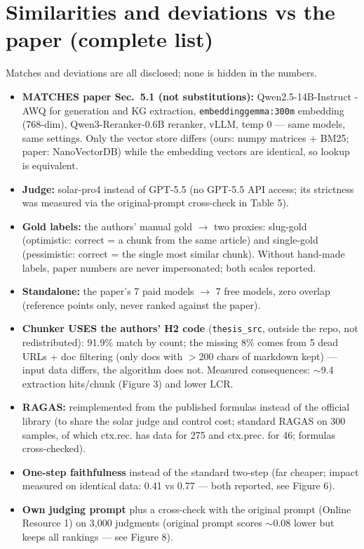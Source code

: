 \documentclass[12pt,a4paper]{article}
\begin{document}
\section{Similarities and deviations vs the paper (complete list)}
Matches and deviations are all disclosed; none is hidden in the numbers.
\begin{itemize}[leftmargin=*]
\item \textbf{MATCHES paper Sec.~5.1 (not substitutions):} Qwen2.5-14B-Instruct
-AWQ for generation and KG extraction, \texttt{embeddinggemma:300m} embedding
(768-dim), Qwen3-Reranker-0.6B reranker, vLLM, temp 0 --- same models, same
settings. Only the vector store differs (ours: numpy matrices + BM25; paper:
NanoVectorDB) while the embedding vectors are identical, so lookup is
equivalent.
\item \textbf{Judge:} solar-pro4 instead of GPT-5.5 (no GPT-5.5 API access; its
strictness was measured via the original-prompt cross-check in Table 5).
\item \textbf{Gold labels:} the authors' manual gold $\rightarrow$ two proxies:
slug-gold (optimistic: correct = a chunk from the same article) and
single-gold (pessimistic: correct = the single most similar chunk). Without
hand-made labels, paper numbers are never impersonated; both scales reported.
\item \textbf{Standalone:} the paper's 7 paid models $\rightarrow$ 7 free models,
zero overlap (reference points only, never ranked against the paper).
\item \textbf{Chunker USES the authors' H2 code} (\texttt{thesis\_src}, outside
the repo, not redistributed): 91.9\% match by count; the missing 8\% comes from
5 dead URLs + doc filtering (only docs with $>$200 chars of markdown kept) ---
input data differs, the algorithm does not. Measured consequences: $\sim$9.4
extraction hits/chunk (Figure 3) and lower LCR.
\item \textbf{RAGAS:} reimplemented from the published formulas instead of the
official library (to share the solar judge and control cost; standard RAGAS on
300 samples, of which ctx.rec. has data for 275 and ctx.prec. for 46; formulas
cross-checked).
\item \textbf{One-step faithfulness} instead of the standard two-step (far
cheaper; impact measured on identical data: 0.41 vs 0.77 --- both reported, see
Figure 6).
\item \textbf{Own judging prompt} plus a cross-check with the original prompt
(Online Resource 1) on 3,000 judgments (original prompt scores $\sim$0.08 lower
but keeps all rankings --- see Figure 8).
\end{itemize}
\end{document}
